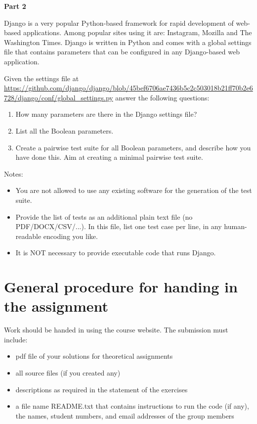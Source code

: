 \documentclass{pracs}
\begin{document}
\textbf{Part 2}

Django is a very popular Python-based framework for rapid development of web-based applications. Among popular sites using it are: Instagram, Mozilla and The Washington Times. Django is written in Python and comes with a global settings file that contains parameters that can be configured in any Django-based web application. 

Given the settings file at\\
\url{https://github.com/django/django/blob/45bef6706ae7436b5c2c503018b21ff70b2e6728/django/conf/global_settings.py}
answer the following questions:

\begin{enumerate}
\item How many parameters are there in the Django settings file?
\item List all the Boolean parameters.
\item Create a pairwise test suite for all Boolean parameters, and describe how you have done this. Aim at creating a minimal pairwise test suite. 
\end{enumerate}

Notes:
\begin{itemize}
\item You are not allowed to use any existing software for the generation of the test suite.
\item Provide the list of tests as an additional plain text file (no PDF/DOCX/CSV/...). In this file, list one test case per line, in any human-readable encoding you like.
\item It is NOT necessary to provide executable code that runs Django.
\end{itemize}







\section{General procedure for handing in the assignment}
Work should be handed in using the course website. The submission must include:
\begin{itemize}
\item pdf file of your solutions for theoretical assignments
\item all source files (if you created any)
\item descriptions as required in the statement of the exercises
\item a file name README.txt that contains instructions to run the code (if any), the names, student numbers, and email addresses of the group members
\end{itemize}
\end{document}
